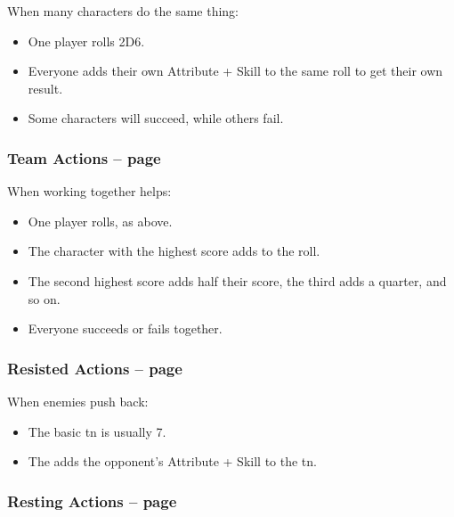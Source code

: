 \begin{multicols}{2}
When many characters do the same thing:

\begin{itemize}

  \item
  One player rolls 2D6.
  \item
  Everyone adds their own Attribute + Skill to the same roll to get their own result.
  \item
  Some characters will succeed, while others fail.

\end{itemize}

\subsubsection{Team Actions -- page \pageref{teamwork}}

When working together helps:

\begin{itemize}

  \item
  One player rolls, as above.
  \item
  The character with the highest score adds to the roll.
  \item
  The second highest score adds half their score, the third adds a quarter, and so on.
  \item
  Everyone succeeds or fails together.

\end{itemize}

\subsubsection{Resisted Actions -- page \pageref{resistedactions}}

When enemies push back:

\begin{itemize}

  \item{The basic \gls{tn} is usually 7.}
  \item{The  adds the opponent's Attribute + Skill to the \gls{tn}.}

\end{itemize}

\subsubsection{Resting Actions -- page \pageref{restingactions}}


\end{multicols}
